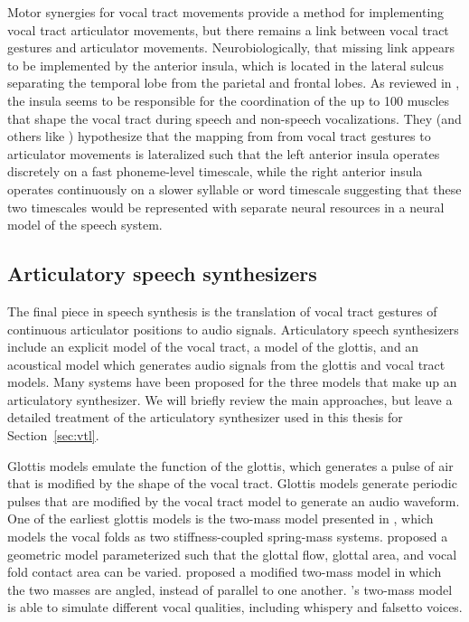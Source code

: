 
Motor synergies for vocal tract movements
provide a method for implementing
vocal tract articulator movements,
but there remains a link
between vocal tract gestures
and articulator movements.
Neurobiologically,
that missing link appears to be
implemented by the anterior insula,
which is located in the lateral sulcus
separating the temporal lobe from
the parietal and frontal lobes.
As reviewed in \citet{ackermann2004},
the insula seems to be responsible
for the coordination of the up to 100 muscles
that shape the vocal tract during speech
and non-speech vocalizations.
They (and others like \citealt{ivry1998})
hypothesize that the mapping from
from vocal tract gestures to articulator movements
is lateralized such that
the left anterior insula operates
discretely on a fast phoneme-level timescale,
while the right anterior insula
operates continuously on a slower
syllable or word timescale
suggesting that these two timescales
would be represented
with separate neural resources
in a neural model of the speech system.

\subsection{Articulatory speech synthesizers}
\label{sec:art-synth}

The final piece in speech synthesis
is the translation of vocal tract gestures
of continuous articulator positions
to audio signals.
Articulatory speech synthesizers
include an explicit model
of the vocal tract,
a model of the glottis,
and an acoustical model
which generates audio signals
from the glottis and vocal tract models.
Many systems have been proposed
for the three models that make up
an articulatory synthesizer.
We will briefly review
the main approaches,
but leave a detailed treatment
of the articulatory synthesizer
used in this thesis
for Section~\ref{sec:vtl}.

Glottis models emulate the function
of the glottis,
which generates a pulse of air
that is modified by the shape
of the vocal tract.
Glottis models generate periodic pulses
that are modified by the vocal tract model
to generate an audio waveform.
One of the earliest glottis models
is the two-mass model
presented in \citet{ishizaka1972},
which models the vocal folds
as two stiffness-coupled
spring-mass systems.
\citet{titze1989}
proposed a geometric model
parameterized such that
the glottal flow,
glottal area, and vocal fold
contact area can be varied.
\citet{birkholz2011}
proposed a modified two-mass model
in which the two masses
are angled, instead of parallel
to one another.
\citeauthor{birkholz2011}'s two-mass model
is able to simulate
different vocal qualities,
including whispery and falsetto voices.

